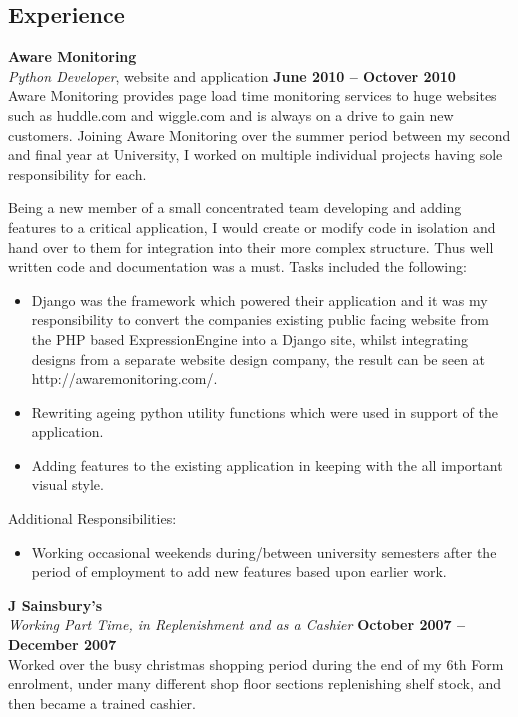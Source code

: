 \documentclass[margin,line]{resume}
\begin{document}
\begin{resume}
    \section{\mysidestyle Experience}

    \textbf{Aware Monitoring} \vspace{2mm}\\\vspace{1mm}%
    \textsl{Python Developer}, website and application \hfill \textbf{June 2010 -- Octover 2010}\\
    Aware Monitoring provides page load time monitoring services to huge websites such as huddle.com and wiggle.com and is always on a drive to gain new customers.
	Joining Aware Monitoring over the summer period between my second and final year at University, I worked on multiple individual projects having sole responsibility for each.

	Being a new member of a small concentrated team developing and adding features to a critical application, I would create or modify code in isolation and hand over to them for integration into their more complex structure. Thus well written code and documentation was a must.
	Tasks included the following:
	\begin{itemize}
		\item Django was the framework which powered their application and it was my responsibility to convert the companies existing public facing website from the PHP based ExpressionEngine into a Django site, whilst integrating designs from a separate website design company, the result can be seen at http://awaremonitoring.com/.
		\item Rewriting ageing python utility functions which were used in support of the application.
		\item Adding features to the existing application in keeping with the all important visual style.
	\end{itemize}
	
	Additional Responsibilities: 
	\begin{itemize}
		\item Working occasional weekends during/between university semesters after the period of employment to add new features based upon earlier work.
	\end{itemize}
	
	\newpage
	\textbf{J Sainsbury's} \vspace{2mm}\\\vspace{1mm}%
	\textsl{Working Part Time, in Replenishment and as a Cashier}  \hfill \textbf{October 2007 -- December 2007}\\
	Worked over the busy christmas shopping period during the end of my 6th Form enrolment, under many different shop floor sections replenishing shelf stock, and then became a trained cashier.
	

\end{resume}
\end{document}
